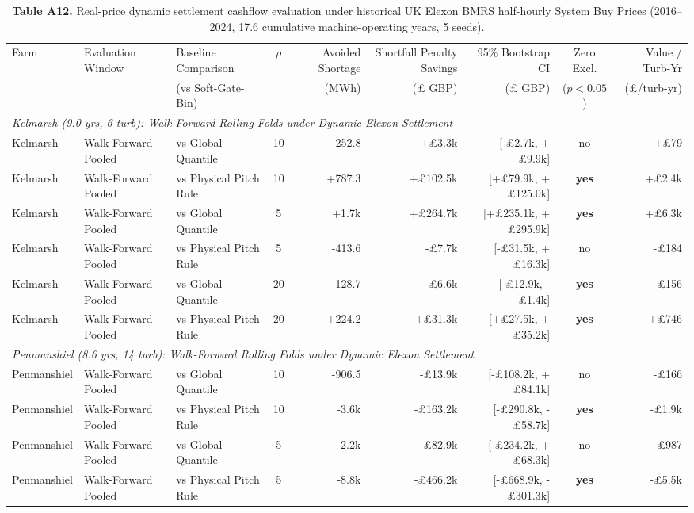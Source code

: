 \begin{table}[t]
\centering
\scriptsize
\setlength{\tabcolsep}{3.5pt}
\renewcommand{\arraystretch}{1.08}
\caption*{\textbf{Table A12.} Real-price dynamic settlement cashflow evaluation under historical UK Elexon BMRS half-hourly System Buy Prices (2016--2024, 17.6 cumulative machine-operating years, 5 seeds).}
\begin{tabular*}{\textwidth}{@{\extracolsep{\fill}}lllcrrrcr@{}}
\toprule
Farm & Evaluation Window & Baseline Comparison & $\rho$ & Avoided Shortage & Shortfall Penalty Savings & 95\% Bootstrap CI & Zero Excl. & Value / Turb-Yr \\
 & & (vs Soft-Gate-Bin) & & (MWh) & (£ GBP) & (£ GBP) & ($p < 0.05$) & (£/turb-yr) \\
\midrule
\multicolumn{9}{l}{\textit{Kelmarsh (9.0 yrs, 6 turb): Walk-Forward Rolling Folds under Dynamic Elexon Settlement}} \\
Kelmarsh & Walk-Forward Pooled & vs Global Quantile & 10 & -252.8 & +£3.3k & [-£2.7k, +£9.9k] & no & +£79 \\
Kelmarsh & Walk-Forward Pooled & vs Physical Pitch Rule & 10 & +787.3 & +£102.5k & [+£79.9k, +£125.0k] & \textbf{yes} & +£2.4k \\
Kelmarsh & Walk-Forward Pooled & vs Global Quantile & 5 & +1.7k & +£264.7k & [+£235.1k, +£295.9k] & \textbf{yes} & +£6.3k \\
Kelmarsh & Walk-Forward Pooled & vs Physical Pitch Rule & 5 & -413.6 & -£7.7k & [-£31.5k, +£16.3k] & no & -£184 \\
Kelmarsh & Walk-Forward Pooled & vs Global Quantile & 20 & -128.7 & -£6.6k & [-£12.9k, -£1.4k] & \textbf{yes} & -£156 \\
Kelmarsh & Walk-Forward Pooled & vs Physical Pitch Rule & 20 & +224.2 & +£31.3k & [+£27.5k, +£35.2k] & \textbf{yes} & +£746 \\
\midrule
\multicolumn{9}{l}{\textit{Penmanshiel (8.6 yrs, 14 turb): Walk-Forward Rolling Folds under Dynamic Elexon Settlement}} \\
Penmanshiel & Walk-Forward Pooled & vs Global Quantile & 10 & -906.5 & -£13.9k & [-£108.2k, +£84.1k] & no & -£166 \\
Penmanshiel & Walk-Forward Pooled & vs Physical Pitch Rule & 10 & -3.6k & -£163.2k & [-£290.8k, -£58.7k] & \textbf{yes} & -£1.9k \\
Penmanshiel & Walk-Forward Pooled & vs Global Quantile & 5 & -2.2k & -£82.9k & [-£234.2k, +£68.3k] & no & -£987 \\
Penmanshiel & Walk-Forward Pooled & vs Physical Pitch Rule & 5 & -8.8k & -£466.2k & [-£668.9k, -£301.3k] & \textbf{yes} & -£5.5k \\

\end{tabular*}
\end{table}

